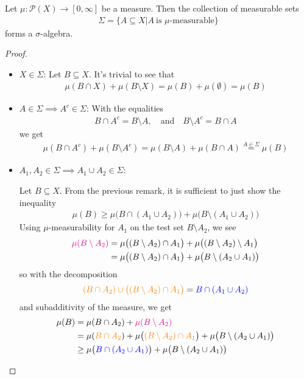 \begin{thm}[]
  Let $\mu: \mathcal{P}(X) \to [0,\infty]$ be a measure. Then the collection of measurable sets
  \begin{align*}
    \Sigma = \{A \subseteq X \big\vert A\ \text{is $\mu$-measurable}\}
  \end{align*}
  forms a $\sigma$-algebra.
\end{thm}
\begin{proof}
  \phantom{a}
\begin{itemize}
  \item $X\in \Sigma$: 
    Let $B \subseteq X$. It's trivial to see that
    \begin{align*}
      \mu(B \cap X) + \mu(B \setminus X) = \mu(B) + \mu(\emptyset) = \mu(B)
    \end{align*}
  \item $A \in \Sigma \implies A^{c} \in \Sigma$: With the equalities
    \begin{align*}
      B \cap A^{c} = B \setminus A, \quad \text{and} \quad B \setminus A^{c} = B \cap A
    \end{align*}
    we get 
    \begin{align*}
      \mu(B \cap A^{c}) + \mu(B \setminus A^{c}) = \mu(B \setminus A) + \mu(B \cap A) \stackrel{A \in \Sigma}{=} \mu(B)
    \end{align*}
  \item $A_1,A_2 \in \Sigma \implies A_1 \cup A_2 \in \Sigma$: 

    Let $B \subseteq X$. From the previous remark, it is sufficient to just show the inequality
    \begin{align*}
      \mu(B) \geq \mu\big(B \cap (A_1 \cup A_2)\big) + \mu \big(B \setminus (A_1 \cup A_2)\big)
    \end{align*}
    Using $\mu$-measurability for $A_1$ on the test set $B \setminus A_2$, we see
    \begin{align*}
      {\color{magenta}\mu(B \setminus A_2)}
      &= 
      \mu\big((B \setminus A_2) \cap A_1\big) + \mu \big((B \setminus A_2) \setminus A_1\big)\\
      &= 
      \mu \big((B \setminus A_2) \cap A_1\big) 
      + 
      \mu \big(B \setminus (A_2 \cup A_1)\big)
    \end{align*}
    so with the decomposition
    \begin{align*}
      {\color{orange}(B \cap A_2) \cup \big((B \setminus A_2) \cap A_1\big)} = {\color{blue}B \cap (A_1 \cup A_2)}
    \end{align*}  
    and subadditivity of the measure, we get
    \begin{align*}
      \mu(B) 
      &= \mu(B \cap A_2) + {\color{magenta}\mu(B \setminus A_2)}\\
      &=  \mu({\color{orange}B \cap A_2}) 
      + \mu \big({\color{orange}(B \setminus A_2) \cap A_1}\big) 
        + \mu \big(B \setminus (A_2 \cup A_1)\big)\\
      &\geq \mu \big({\color{blue}B \cap (A_2 \cup A_1)}\big) 
        + \mu \big(B \setminus (A_2 \cup A_1)\big)
    \end{align*}



\end{itemize}
\end{proof}
